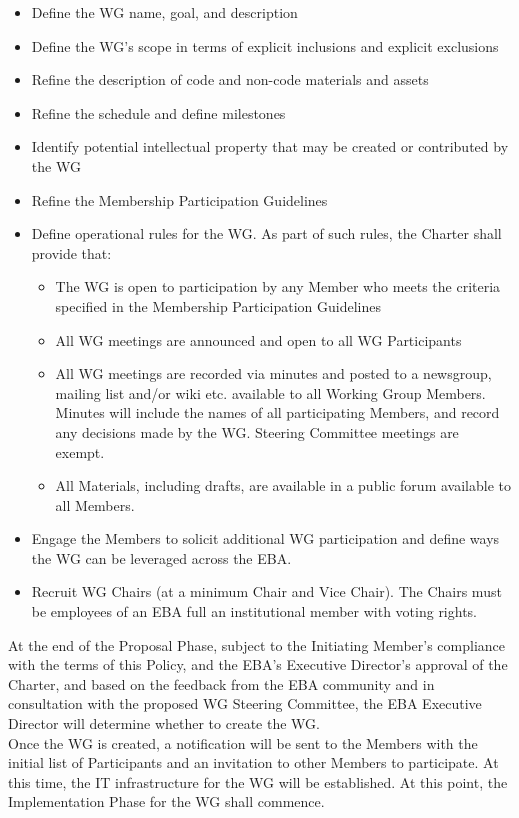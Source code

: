 \documentclass{article}
\begin{document}
\begin{itemize}
	\item Define the WG name, goal, and description
	\item Define the WG's scope in terms of explicit inclusions and explicit exclusions
	\item Refine the description of code and non-code materials and assets
	\item Refine the schedule and define milestones
	\item Identify potential intellectual property that may be created or contributed by the WG
	\item Refine the Membership Participation Guidelines
	\item Define operational rules for the WG. 
	As part of such rules, the Charter shall provide that:
	
	\begin{itemize}
		\item The WG is open to participation by any Member who meets the criteria specified in the Membership Participation Guidelines
		\item All WG meetings are announced and open to all WG Participants
		\item All WG meetings are recorded via minutes and posted to a newsgroup, mailing list and/or wiki etc. available to all Working Group Members. 
		Minutes will include the names of all participating Members, and record any decisions made by the WG. 
		Steering Committee meetings are exempt.
		\item All Materials, including drafts, are available in a public forum available to all Members.
	\end{itemize}
	
	\item Engage the Members to solicit additional WG participation and define ways the WG can be leveraged across the EBA.
	\item Recruit WG Chairs (at a minimum Chair and Vice Chair). 
	The Chairs must be employees of an EBA full an institutional member with voting rights.
	
\end{itemize}

At the end of the Proposal Phase, subject to the Initiating Member's compliance with the terms of this Policy, and the EBA's Executive Director's approval of the Charter, and based on the feedback from the EBA community and in consultation with the proposed WG Steering Committee, the EBA Executive Director will determine whether to create the WG. \\
Once the WG is created, a notification will be sent to the Members with the initial list of Participants and an invitation to other Members to participate. 
At this time, the IT infrastructure for the WG will be established. 
At this point, the Implementation Phase for the WG shall commence.
\end{document}
